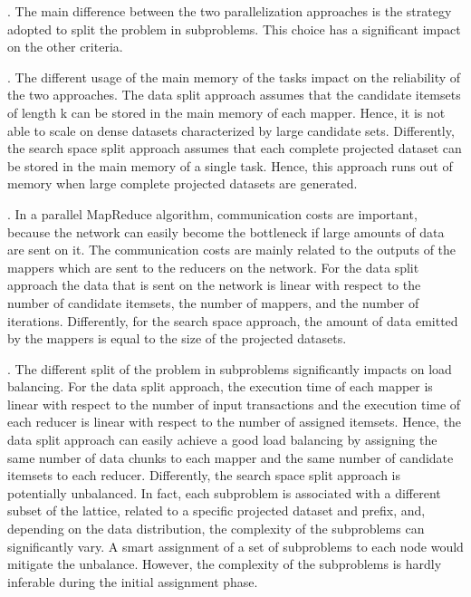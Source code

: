 \documentclass[preprint,review,12pt]{elsarticle}
\begin{document}
. 
The main difference between the two parallelization approaches is the strategy adopted to split the problem in subproblems. This choice has a significant impact on the other criteria.

. 
The different usage of the main memory of the tasks impact on the reliability of the two approaches. The data split approach assumes that the candidate itemsets of length k can be stored in the main memory of each mapper. Hence, it is not able to scale on dense datasets
characterized by large candidate sets. Differently, the search space split approach assumes that each complete projected dataset can be stored in the main memory of a single task. Hence, this approach runs out of memory when large complete projected datasets are generated.  

. In a parallel MapReduce algorithm, communication costs are important, because the network can easily become the bottleneck if large amounts of data are sent on it.
The communication costs are mainly related to the outputs of the mappers which are sent to the reducers on the network. 
For the data split approach the data that is sent on the network is linear with respect 
to the number of candidate itemsets, the number of mappers, and the number of iterations.
Differently, for the search space approach, the amount of data emitted by the mappers is equal to the size of the projected datasets. 


. 
The different split of the problem in subproblems significantly impacts on load balancing. For the data split approach, the execution time of each mapper 
is linear with respect to the number of input transactions and the execution time of each reducer is linear with respect to the number of assigned itemsets.
Hence, the data split approach can easily achieve a good load balancing by assigning the same number of data chunks to each mapper and the same number of candidate itemsets to each reducer. 
Differently, the search space split approach is potentially unbalanced. In fact, each subproblem is associated with a different subset of the lattice, related to a specific projected dataset and prefix, and, depending on the data distribution, the complexity of the subproblems can significantly vary. 
A smart assignment of a set of subproblems to each node would mitigate the unbalance. However, the complexity of the subproblems is hardly inferable during the initial assignment phase.
\end{document}
